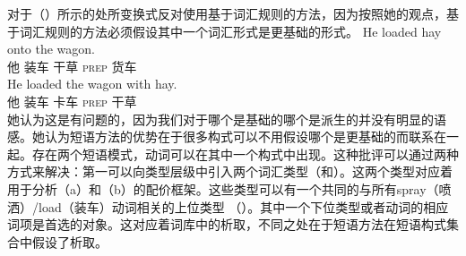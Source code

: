 \begin{exe}
\begin{xlist}[iv.]
\begin{exe}
\begin{xlist}[iv.]
\citet[]{Goldberg95a}对于（）所示的处所变换式反对使用基于词汇规则的方法，因为按照她的观点，基于词汇规则的方法必须假设其中一个词汇形式是更基础的形式。
\eal
\ex
\gll He loaded hay onto the wagon.\\
     他 装车 干草 \textsc{prep}  货车\\
\ex
\gll He loaded the wagon with hay.\\
     他 装车  卡车 \textsc{prep} 干草\\
\zl
她认为这是有问题的，因为我们对于哪个是基础的哪个是派生的并没有明显的语感。她认为短语方法的优势在于很多构式可以不用假设哪个是更基础的而联系在一起。存在两个短语模式，动词可以在其中一个构式中出现。这种批评可以通过两种方式来解决：第一可以向类型层级中引入两个词汇类型（和）。这两个类型对应着用于分析（a）和（b）的配价框架。这些类型可以有一个共同的与所有spray（喷洒）/load（装车）动词相关的上位类型 （）。其中一个下位类型或者动词的相应词项是首选的对象。这对应着词库中的析取，不同之处在于短语方法在短语构式集合中假设了析取。


\end{xlist}
\end{exe}
\end{xlist}
\end{exe}
